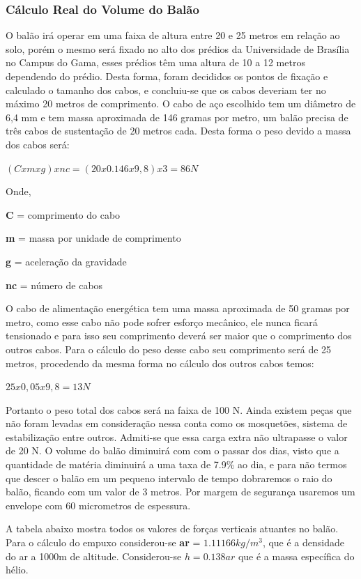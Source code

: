 
\subsubsection{Cálculo Real do Volume do Balão}

 O  balão irá operar em uma faixa de altura entre 20 e 25 metros em relação ao solo, porém  o mesmo será fixado no alto dos prédios da Universidade de Brasília no Campus do Gama, esses prédios têm uma altura de 10 a 12 metros dependendo do prédio. Desta forma, foram decididos os pontos de fixação e calculado o tamanho dos cabos, e concluiu-se que os cabos deveriam ter no máximo 20 metros de comprimento. 
O cabo de aço escolhido tem um diâmetro de 6,4 mm e tem massa aproximada de 146 gramas por metro, um balão precisa de três cabos de sustentação de 20 metros cada. Desta forma o peso devido a massa dos cabos será:

$(C x m x g) x nc = (20 x 0.146 x 9,8 ) x 3 = 86 N$

Onde,

\textbf{C} = comprimento do cabo

\textbf{m} = massa por unidade de comprimento

\textbf{g} =  aceleração da gravidade

\textbf{nc} = número de cabos

O cabo de alimentação energética tem uma massa aproximada de 50 gramas por metro, como esse cabo não pode sofrer esforço mecânico, ele nunca  ficará tensionado e para isso seu comprimento deverá ser maior que o comprimento dos outros cabos. Para o cálculo do peso desse cabo seu comprimento será de 25 metros, procedendo da mesma forma no cálculo dos outros cabos temos:

$25 x 0,05x 9,8 = 13 N$

Portanto o peso total dos cabos será na faixa de 100 N.
Ainda existem peças que não foram levadas em consideração nessa conta como os mosquetões, sistema de estabilização entre outros. Admiti-se que essa carga extra não ultrapasse o valor de 20 N.
O volume do balão diminuirá com com o passar dos dias, visto que a quantidade de matéria diminuirá a uma taxa de 7.9\% ao dia, e para não termos que descer o balão em um pequeno intervalo de tempo dobraremos o raio do balão, ficando com um valor de 3 metros. Por margem de segurança usaremos um envelope com 60 micrometros de espessura.

A tabela abaixo mostra todos os valores de forças verticais atuantes no balão. Para o cálculo do empuxo considerou-se \textbf{ar}  = $1.11166 kg/m^3$, que é a densidade do ar a 1000m de altitude. Considerou-se $h = 0.138 ar$ que é a massa específica do hélio.

